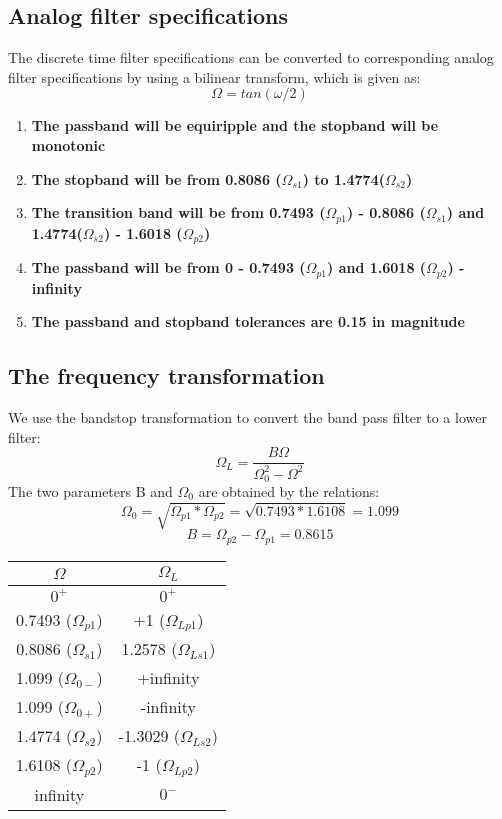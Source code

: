\documentclass[12pt]{article}
\begin{document}
\subsection{Analog filter specifications }
The discrete time filter specifications can be converted to corresponding analog filter specifications by using a bilinear transform, which is given as:
\begin{equation}
    \Omega = tan(\omega/2)
\end{equation}
\begin{enumerate}
    \item \textbf{The passband will be equiripple and the stopband will be monotonic}
    \item \textbf{The stopband will be from 0.8086 ($\Omega_{s1}$) to 1.4774($\Omega_{s2}$)}
    \item \textbf{The transition band will be from 0.7493 ($\Omega_{p1}$) - 0.8086 ($\Omega_{s1}$) and \\1.4774($\Omega_{s2}$) - 1.6018 ($\Omega_{p2}$)}
    \item \textbf{The passband will be from 0 - 0.7493 ($\Omega_{p1}$)  and 1.6018 ($\Omega_{p2}$) - infinity} 
    \item \textbf{The passband and stopband tolerances are 0.15 in magnitude}
\end{enumerate}
\subsection{The frequency transformation }
We use the bandstop transformation to convert the band pass filter to a lower filter:
\begin{equation}
    \Omega_L=\frac{B\Omega}{\Omega_{0}^2-\Omega^2}
\end{equation}
The two parameters B and $\Omega_{0}$ are obtained by the relations:
\begin{equation}
    \Omega_{0}=\sqrt{\Omega_{p1}*\Omega_{p2}}= \sqrt{0.7493*1.6108}=1.099
    \end{equation}
    \begin{equation}   
    B=\Omega_{p2}-\Omega_{p1}=0.8615
 \end{equation}
 \begin{center}
\def\arraystretch{1.1}
\bgroup
\begin{tabular}{|c|c|}
\hline
\textbf{$\Omega$ }
& \textbf{$\Omega_L$ }\\ 
\hline \hline
$0^+$  &  $0^+$  \\ 
\hline 
0.7493 ($\Omega_{p1}$)   &   +1 ($\Omega_{Lp1}$) \\ 
\hline
0.8086 ($\Omega_{s1}$)  &   1.2578  ($\Omega_{Ls1}$)\\ 
\hline
1.099  ($\Omega_{0-}$) & +infinity  \\ 
\hline
1.099  ($\Omega_{0+}$) & -infinity  \\ 
\hline
1.4774 ($\Omega_{s2}$)   &  -1.3029 ($\Omega_{Ls2}$) \\ 
\hline
1.6108 ($\Omega_{p2}$)  &   -1 ($\Omega_{Lp2}$) \\ 
 \hline
 infinity & $0^-$ \\
 \hline
\end{tabular}
\egroup
\end{center}
\end{document}
